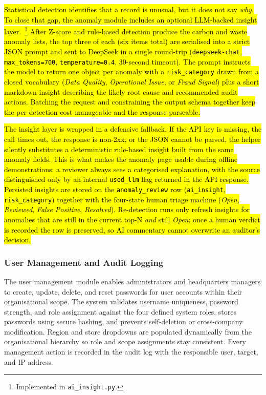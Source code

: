 \documentclass[11pt,a4paper]{article}
\newcommand{\new}[1]{\hl{#1}}
\begin{document}
\new{Statistical detection identifies that a record is unusual, but it does not say \emph{why}. To close that gap, the anomaly module includes an optional LLM-backed insight layer.~\footnote{Implemented in \texttt{ai\_insight.py}.} After Z-score and rule-based detection produce the carbon and waste anomaly lists, the top three of each (six items total) are serialised into a strict JSON prompt and sent to DeepSeek in a single round-trip (\texttt{deepseek-chat}, \texttt{max\_tokens=700}, \texttt{temperature=0.4}, 30-second timeout). The prompt instructs the model to return one object per anomaly with a \texttt{risk\_category} drawn from a closed vocabulary (\emph{Data Quality}, \emph{Operational Issue}, or \emph{Fraud Signal}) plus a short markdown insight describing the likely root cause and recommended audit actions. Batching the request and constraining the output schema together keep the per-detection cost manageable and the response parseable.}

\new{The insight layer is wrapped in a defensive fallback. If the API key is missing, the call times out, the response is non-2xx, or the JSON cannot be parsed, the helper silently substitutes a deterministic rule-based insight built from the same anomaly fields. This is what makes the anomaly page usable during offline demonstrations: a reviewer always sees a categorised explanation, with the source distinguished only by an internal \texttt{used\_llm} flag returned in the API response. Persisted insights are stored on the \texttt{anomaly\_review} row (\texttt{ai\_insight}, \texttt{risk\_category}) together with the four-state human triage machine (\emph{Open}, \emph{Reviewed}, \emph{False Positive}, \emph{Resolved}). Re-detection runs only refresh insights for anomalies that are still in the current top-N \emph{and} still \emph{Open}: once a human verdict is recorded the row is preserved, so AI commentary cannot overwrite an auditor's decision.}

\subsubsection{User Management and Audit Logging}
The user management module enables administrators and headquarters managers to create, update, delete, and reset passwords for user accounts within their organisational scope. The system validates username uniqueness, password strength, and role assignment against the four defined system roles, stores passwords using secure hashing, and prevents self-deletion or cross-company modification. Region and store dropdowns are populated dynamically from the organisational hierarchy so role and scope assignments stay consistent. Every management action is recorded in the audit log with the responsible user, target, and IP address.
\end{document}

